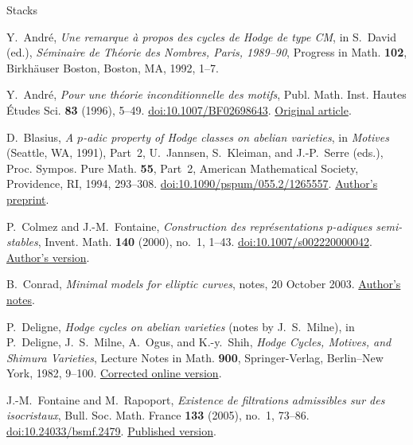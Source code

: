 \begin{thebibliography}{Stacks}

Y.~Andr\'e,
\emph{Une remarque \`a propos des cycles de Hodge de type CM},
in S.~David (ed.), \emph{S\'eminaire de Th\'eorie des Nombres,
Paris, 1989--90}, Progress in Math. \textbf{102},
Birkh\"auser Boston, Boston, MA, 1992, 1--7.

Y.~Andr\'e,
\emph{Pour une th\'eorie inconditionnelle des motifs},
Publ. Math. Inst. Hautes \'{E}tudes Sci. \textbf{83} (1996), 5--49.
\href{https://doi.org/10.1007/BF02698643}{doi:10.1007/BF02698643}.
\href{https://www.numdam.org/item/10.1007/BF02698643.pdf}{Original article}.

D.~Blasius,
\emph{A $p$-adic property of Hodge classes on abelian varieties},
in \emph{Motives} (Seattle, WA, 1991), Part~2,
U.~Jannsen, S.~Kleiman, and J.-P.~Serre (eds.),
Proc. Sympos. Pure Math. \textbf{55}, Part~2,
American Mathematical Society, Providence, RI, 1994, 293--308.
\href{https://doi.org/10.1090/pspum/055.2/1265557}{doi:10.1090/pspum/055.2/1265557}.
\href{https://archive.mpim-bonn.mpg.de/id/eprint/3859/1/preprint_1992_59.pdf}{Author's preprint}.

P.~Colmez and J.-M.~Fontaine,
\emph{Construction des repr\'esentations $p$-adiques semi-stables},
Invent. Math. \textbf{140} (2000), no.~1, 1--43.
\href{https://doi.org/10.1007/s002220000042}{doi:10.1007/s002220000042}.
\href{https://www.imo.universite-paris-saclay.fr/~fontaine/CF.pdf}{Author's version}.

B.~Conrad,
\emph{Minimal models for elliptic curves}, notes, 20 October 2003.
\href{https://math.stanford.edu/~conrad/vigregroup/vigre03/minimalmodel.pdf}{Author's notes}.

P.~Deligne,
\emph{Hodge cycles on abelian varieties} (notes by J.~S.~Milne),
in P.~Deligne, J.~S.~Milne, A.~Ogus, and K.-y.~Shih,
\emph{Hodge Cycles, Motives, and Shimura Varieties},
Lecture Notes in Math. \textbf{900}, Springer-Verlag,
Berlin--New York, 1982, 9--100.
\href{https://www.jmilne.org/math/Documents/Deligne82.pdf}{Corrected online version}.

J.-M.~Fontaine and M.~Rapoport,
\emph{Existence de filtrations admissibles sur des isocristaux},
Bull. Soc. Math. France \textbf{133} (2005), no.~1, 73--86.
\href{https://doi.org/10.24033/bsmf.2479}{doi:10.24033/bsmf.2479}.
\href{https://www.numdam.org/article/BSMF_2005__133_1_73_0.pdf}{Published version}.


\end{thebibliography}
